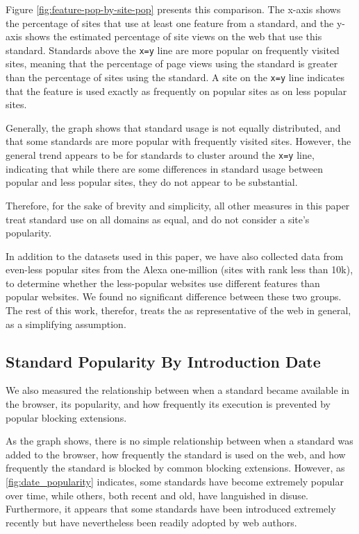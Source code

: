 Figure \ref{fig:feature-pop-by-site-pop} presents this comparison.
The x-axis shows the percentage of sites that use at least one feature from a
standard, and the y-axis shows the estimated percentage of site views on the
web that use this standard.  Standards above the \texttt{x=y} line are more
popular on frequently visited sites, meaning that the percentage of page views
using the standard is greater than the percentage of sites using the standard.
A site on the \texttt{x=y} line indicates that the feature is used exactly as
frequently on popular sites as on less popular sites.

Generally, the graph shows that standard usage is not equally distributed, and
that some standards are more popular with frequently visited sites.  However,
the general trend appears to be for standards to cluster around the
\texttt{x=y} line, indicating that while there are some differences in standard
usage between popular and less popular sites, they do not appear to be
substantial.

Therefore, for the sake of brevity and simplicity, all other measures in this
paper treat standard use on all domains as equal, and do not consider a site's
popularity.

In addition to the datasets used in this paper, we have also collected data
from even-less popular sites from the Alexa one-million (sites with rank less
than 10k), to determine whether the less-popular websites use different
features than popular websites.  We found no significant difference
between these two groups.  The rest of this work, therefor, treats the \ATK as
representative of the web in general, as a simplifying assumption.


\subsection{Standard Popularity By Introduction Date}

We also measured the relationship between when a standard became available in
the browser, its popularity, and how frequently its execution is prevented by
popular blocking extensions.

As the graph shows, there is no simple relationship between when a standard was
added to the browser, how frequently the standard is used on the web, and how
frequently the standard is blocked by common blocking extensions.  However, as
\ref{fig:date_popularity} indicates, some standards have become extremely
popular over time, while others, both recent and old, have languished in
disuse. Furthermore, it appears that some standards have been introduced
extremely recently but have nevertheless been readily adopted by web authors.

